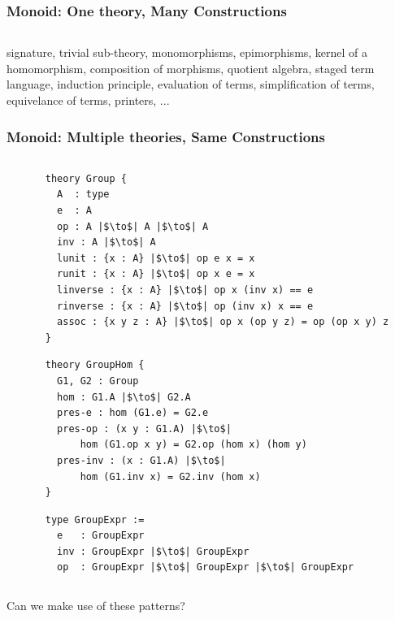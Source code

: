 \documentclass[t,10pt,numbers,fleqn,usenames,xcolor=dvipsnames]{beamer}
\begin{document}
\begin{frame}[fragile] 
\frametitle{Monoid: One theory, Many Constructions} 
\begin{columns}
    \begin{column}{0.45\textwidth}
 
     \end{column}
     \begin{column}{0.45\textwidth} 
 
     \end{column}  
\end{columns}
\vspace{0.3cm}      
\scriptsize
signature, trivial sub-theory, monomorphisms, epimorphisms, kernel of a homomorphism, composition of morphisms, quotient algebra, staged term language, induction principle, evaluation of terms, simplification of terms, equivelance of terms, printers, ... 
\end{frame}

\begin{frame}[fragile]
\frametitle{Monoid: Multiple theories, Same Constructions}
\begin{columns}
    \begin{column}{0.45\textwidth}

\vspace{0.65cm}

\vspace{0.35cm}          

     \end{column} 
     \begin{column}{0.45\textwidth}
     
        \begin{verbatim}
theory Group {
  A  : type 
  e  : A
  op : A |$\to$| A |$\to$| A
  inv : A |$\to$| A
  lunit : {x : A} |$\to$| op e x = x
  runit : {x : A} |$\to$| op x e = x
  linverse : {x : A} |$\to$| op x (inv x) == e
  rinverse : {x : A} |$\to$| op (inv x) x == e
  assoc : {x y z : A} |$\to$| op x (op y z) = op (op x y) z 
}
        \end{verbatim}     
\begin{verbatim}  
theory GroupHom { 
  G1, G2 : Group 
  hom : G1.A |$\to$| G2.A
  pres-e : hom (G1.e) = G2.e
  pres-op : (x y : G1.A) |$\to$| 
      hom (G1.op x y) = G2.op (hom x) (hom y)
  pres-inv : (x : G1.A) |$\to$| 
      hom (G1.inv x) = G2.inv (hom x)  
}
\end{verbatim}  
\begin{verbatim}  
type GroupExpr := 
  e   : GroupExpr 
  inv : GroupExpr |$\to$| GroupExpr
  op  : GroupExpr |$\to$| GroupExpr |$\to$| GroupExpr
\end{verbatim}           
\end{column}
\end{columns} 
Can we make use of these patterns? 
\end{frame}
\end{document}
